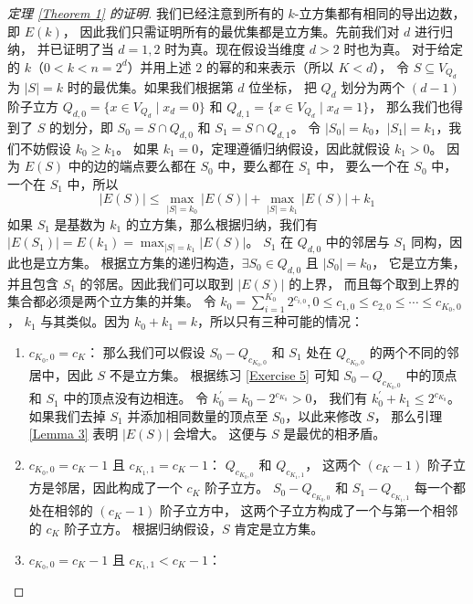 \documentclass[12pt, a4paper]{article}
\begin{document}
\begin{proof}[定理 \ref{Theorem 1} 的证明]
我们已经注意到所有的 $k$-立方集都有相同的导出边数，即 $E(k)$，
因此我们只需证明所有的最优集都是立方集。先前我们对 $d$ 进行归纳，
并已证明了当 $d = 1, 2$ 时为真。现在假设当维度 $d > 2$ 时也为真。
对于给定的 $k$（$0 < k < n = 2^d$）并用上述 $2$ 的幂的和来表示（所以 $K < d$），
令 $S \subseteq V_{Q_d}$ 为 $|S| = k$ 时的最优集。如果我们根据第 $d$ 位坐标，
把 $Q_d$ 划分为两个 $(d − 1)$ 阶子立方
$Q_{d, 0} = \{x \in V_{Q_d} \mid x_d = 0\}$ 和
$Q_{d, 1} = \{x \in V_{Q_d} \mid x_d = 1\}$，
那么我们也得到了 $S$ 的划分，即
$S_0 = S \cap Q_{d, 0}$ 和 $S_1 = S \cap Q_{d, 1}$。
令 $|S_0| = k_0$，$|S_1| = k_1$，我们不妨假设 $k_0 \ge k_1$。
如果 $k_1 = 0$，定理遵循归纳假设，因此就假设 $k_1 > 0$。
因为 $E(S)$ 中的边的端点要么都在 $S_0$ 中，要么都在 $S_1$ 中，
要么一个在 $S_0$ 中，一个在 $S_1$ 中，所以
\begin{equation*}
|E(S)| \le \max_{|S| = k_0} |E(S)| + \max_{|S| = k_1} |E(S)| + k_1
\end{equation*}
如果 $S_1$ 是基数为 $k_1$ 的立方集，那么根据归纳，我们有
$|E(S_1)| = E(k_1) = \max_{|S| = k_1} |E(S)|$。
$S_1$ 在 $Q_{d, 0}$ 中的邻居与 $S_1$ 同构，因此也是立方集。
根据立方集的递归构造，$\exists S_0 \in Q_{d, 0}$ 且 $|S_0| = k_0$，
它是立方集，并且包含 $S_1$ 的邻居。因此我们可以取到 $|E(S)|$ 的上界，
而且每个取到上界的集合都必须是两个立方集的并集。
令 $k_0 = \sum_{i = 1}^{K_0} 2^{c_{i, 0}}, 0 \le c_{1, 0} \le c_{2, 0} \le \cdots \le c_{K_0, 0}$，
$k_1$ 与其类似。因为 $k_0 + k_1 = k$，所以只有三种可能的情况：
\begin{enumerate}[(1)]
	\item $c_{K_0, 0} = c_K$：
		那么我们可以假设 $S_0 - Q_{c_{K_0, 0}}$ 和 $S_1$ 处在
		$Q_{c_{K_0, 0}}$ 的两个不同的邻居中，因此 $S$ 不是立方集。
		根据练习 \ref{Exercise 5} 可知 $S_0 - Q_{c_{K_0, 0}}$
		中的顶点和 $S_1$ 中的顶点没有边相连。
		令 $k_0^{'} = k_0 - 2^{c_{K_0}} > 0$，
		我们有 $k_0^{'} + k_1 \le 2^{c_{K_0}}$。
		如果我们去掉 $S_1$ 并添加相同数量的顶点至 $S_0$，以此来修改 $S$，
		那么引理 \ref{Lemma 3} 表明 $|E(S)|$ 会增大。
		这便与 $S$ 是最优的相矛盾。
	\item $c_{K_0, 0} = c_K - 1$ 且 $c_{K_1, 1} = c_K - 1$：
		$Q_{c_{K_0, 0}}$ 和 $Q_{c_{K_1, 1}}$，
		这两个 $(c_K − 1)$ 阶子立方是邻居，因此构成了一个 $c_K$ 阶子立方。
		$S_0 - Q_{c_{K_0, 0}}$ 和 $S_1 - Q_{c_{K_1, 1}}$
		每一个都处在相邻的 $(c_K − 1)$ 阶子立方中，
		这两个子立方构成了一个与第一个相邻的 $c_K$ 阶子立方。
		根据归纳假设，$S$ 肯定是立方集。
	\item $c_{K_0, 0} = c_K - 1$ 且 $c_{K_1, 1} < c_K - 1$：

\end{enumerate}
\end{proof}
\end{document}
